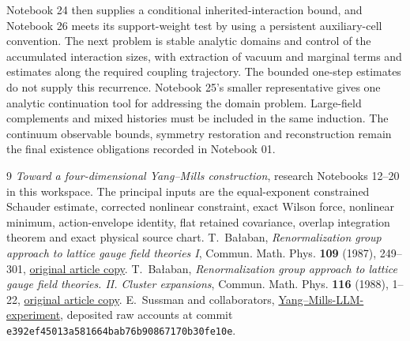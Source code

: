 \documentclass[11pt]{article}
\theoremstyle{remark}
\begin{document}
Notebook 24 then supplies a conditional inherited-interaction
bound, and Notebook 26 meets its support-weight test by using
a persistent auxiliary-cell convention. The next problem is
stable analytic domains and control of the accumulated
interaction sizes, with extraction of vacuum and marginal
terms and estimates along the required coupling trajectory.
The bounded one-step estimates do not supply this recurrence.
Notebook 25's smaller representative gives one analytic
continuation tool for addressing the domain problem.
Large-field complements and mixed histories must be included
in the same induction. The continuum observable bounds,
symmetry restoration and reconstruction remain the final
existence obligations recorded in Notebook 01.

\begin{thebibliography}{9}
\emph{Toward a four-dimensional Yang--Mills construction},
research Notebooks 12--20 in this workspace.
The principal inputs are the equal-exponent constrained
Schauder estimate, corrected nonlinear constraint, exact
Wilson force, nonlinear minimum, action-envelope identity,
flat retained covariance, overlap integration theorem and
exact physical source chart.
T.~Ba\l aban,
\emph{Renormalization group approach to lattice gauge field
theories I}, Commun. Math. Phys. \textbf{109} (1987), 249--301,
\href{https://scispace.com/pdf/renormalization-group-approach-to-lattice-gauge-field-3ygai0vxt1.pdf}{original article copy}.
T.~Ba\l aban,
\emph{Renormalization group approach to lattice gauge field
theories. II. Cluster expansions},
Commun. Math. Phys. \textbf{116} (1988), 1--22,
\href{https://scispace.com/pdf/renormalization-group-approach-to-lattice-gauge-field-4penm4k7hc.pdf}{original article copy}.
E.~Sussman and collaborators,
\href{https://github.com/ethanwsussman/Yang--Mills-LLM-experiment}{Yang--Mills-LLM-experiment},
deposited raw accounts at commit
\texttt{e392ef4501\allowbreak 3a581664ba\allowbreak b76b908671\allowbreak 70b30fe10e}.
\end{thebibliography}
\end{document}
